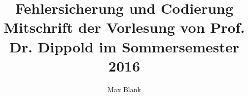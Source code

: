 \documentclass{report}
\begin{document}
\title{%
	Fehlersicherung und Codierung \\
	\large Mitschrift der Vorlesung von Prof. Dr. Dippold im Sommersemester 2016 \\
	}
\author{Max Blank}

\maketitle

\tableofcontents
{}






\printbibliography
\end{document}
